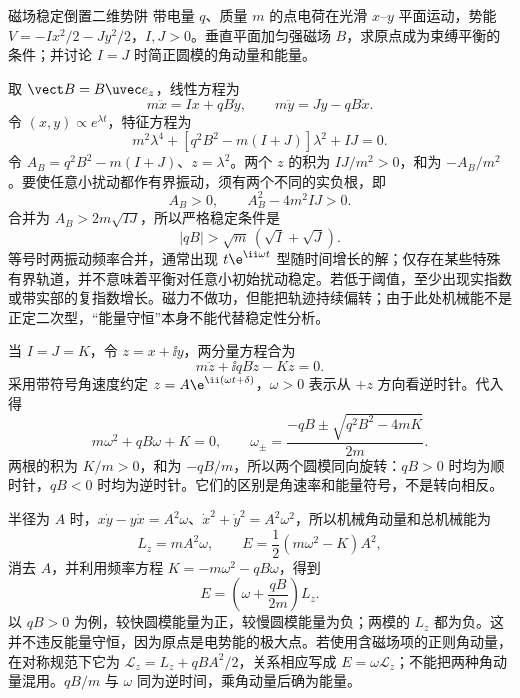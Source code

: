 \begin{practicebox}{磁场稳定倒置二维势阱}
带电量 $q$、质量 $m$ 的点电荷在光滑 $x$--$y$ 平面运动，势能
$V=-Ix^2/2-Jy^2/2$，$I,J>0$。垂直平面加匀强磁场 $B$，求原点成为束缚平衡的条件；并讨论 $I=J$ 时简正圆模的角动量和能量。
\label{r2ch02:pr:006}
\begin{solution}
取 $\vect B=B\uvec e_z$，线性方程为
\[
 m\ddot x=Ix+qB\dot y,\qquad m\ddot y=Jy-qB\dot x.
\]
令 $(x,y)\propto e^{\lambda t}$，特征方程为
\[
 m^2\lambda^4+[q^2B^2-m(I+J)]\lambda^2+IJ=0.
\]
令 $A_B=q^2B^2-m(I+J)$、$z=\lambda^2$。两个 $z$ 的积为 $IJ/m^2>0$，和为 $-A_B/m^2$。要使任意小扰动都作有界振动，须有两个不同的实负根，即
\[
 A_B>0,\qquad A_B^2-4m^2IJ>0.
\]
合并为 $A_B>2m\sqrt{IJ}$，所以严格稳定条件是
\[
 \boxed{|qB|>\sqrt m\,(\sqrt I+\sqrt J)}.
\]
等号时两振动频率合并，通常出现 $t\e^{\ii\omega t}$ 型随时间增长的解；仅存在某些特殊有界轨道，并不意味着平衡对任意小初始扰动稳定。若低于阈值，至少出现实指数或带实部的复指数增长。磁力不做功，但能把轨迹持续偏转；由于此处机械能不是正定二次型，“能量守恒”本身不能代替稳定性分析。

当 $I=J=K$，令 $z=x+\ii y$，两分量方程合为
\[
 m\ddot z+\ii qB\dot z-Kz=0.
\]
采用带符号角速度约定 $z=A\e^{\ii(\omega t+\delta)}$，$\omega>0$ 表示从 $+z$ 方向看逆时针。代入得
\[
 m\omega^2+qB\omega+K=0,\qquad
 \omega_\pm=\frac{-qB\pm\sqrt{q^2B^2-4mK}}{2m}.
\]
两根的积为 $K/m>0$，和为 $-qB/m$，所以两个圆模同向旋转：$qB>0$ 时均为顺时针，$qB<0$ 时均为逆时针。它们的区别是角速率和能量符号，不是转向相反。

半径为 $A$ 时，$x\dot y-y\dot x=A^2\omega$、$\dot x^2+\dot y^2=A^2\omega^2$，所以机械角动量和总机械能为
\[
 L_z=mA^2\omega,\qquad E=\frac12(m\omega^2-K)A^2,
\]
消去 $A$，并利用频率方程 $K=-m\omega^2-qB\omega$，得到
\[
 \boxed{E=\left(\omega+\frac{qB}{2m}\right)L_z}.
\]
以 $qB>0$ 为例，较快圆模能量为正，较慢圆模能量为负；两模的 $L_z$ 都为负。这并不违反能量守恒，因为原点是电势能的极大点。若使用含磁场项的正则角动量，在对称规范下它为
$\mathcal L_z=L_z+qBA^2/2$，关系相应写成 $E=\omega\mathcal L_z$；不能把两种角动量混用。$qB/m$ 与 $\omega$ 同为逆时间，乘角动量后确为能量。
\end{solution}
\end{practicebox}

